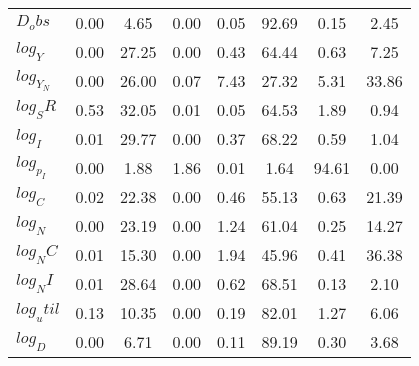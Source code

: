 \begin{center}
\begin{longtable}{lccccccc}
$D_obs     $	 & 	        0.00	 & 	        4.65	 & 	        0.00	 & 	        0.05	 & 	       92.69	 & 	        0.15	 & 	        2.45 \\ 
$log_Y     $	 & 	        0.00	 & 	       27.25	 & 	        0.00	 & 	        0.43	 & 	       64.44	 & 	        0.63	 & 	        7.25 \\ 
$log_Y_N   $	 & 	        0.00	 & 	       26.00	 & 	        0.07	 & 	        7.43	 & 	       27.32	 & 	        5.31	 & 	       33.86 \\ 
$log_SR    $	 & 	        0.53	 & 	       32.05	 & 	        0.01	 & 	        0.05	 & 	       64.53	 & 	        1.89	 & 	        0.94 \\ 
$log_I     $	 & 	        0.01	 & 	       29.77	 & 	        0.00	 & 	        0.37	 & 	       68.22	 & 	        0.59	 & 	        1.04 \\ 
$log_p_I   $	 & 	        0.00	 & 	        1.88	 & 	        1.86	 & 	        0.01	 & 	        1.64	 & 	       94.61	 & 	        0.00 \\ 
$log_C     $	 & 	        0.02	 & 	       22.38	 & 	        0.00	 & 	        0.46	 & 	       55.13	 & 	        0.63	 & 	       21.39 \\ 
$log_N     $	 & 	        0.00	 & 	       23.19	 & 	        0.00	 & 	        1.24	 & 	       61.04	 & 	        0.25	 & 	       14.27 \\ 
$log_NC    $	 & 	        0.01	 & 	       15.30	 & 	        0.00	 & 	        1.94	 & 	       45.96	 & 	        0.41	 & 	       36.38 \\ 
$log_NI    $	 & 	        0.01	 & 	       28.64	 & 	        0.00	 & 	        0.62	 & 	       68.51	 & 	        0.13	 & 	        2.10 \\ 
$log_util  $	 & 	        0.13	 & 	       10.35	 & 	        0.00	 & 	        0.19	 & 	       82.01	 & 	        1.27	 & 	        6.06 \\ 
$log_D     $	 & 	        0.00	 & 	        6.71	 & 	        0.00	 & 	        0.11	 & 	       89.19	 & 	        0.30	 & 	        3.68 \\ 
\end{longtable}
 \end{center}
